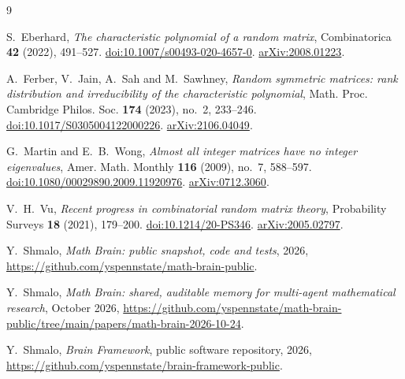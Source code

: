\documentclass[11pt]{amsart}
\theoremstyle{definition}
\theoremstyle{remark}
\numberwithin{equation}{section}
\begin{document}
\begin{thebibliography}{9}

S.~Eberhard,
\emph{The characteristic polynomial of a random matrix},
Combinatorica \textbf{42} (2022), 491--527.
\href{https://doi.org/10.1007/s00493-020-4657-0}{doi:10.1007/s00493-020-4657-0}.
\href{https://arxiv.org/abs/2008.01223}{arXiv:2008.01223}.

A.~Ferber, V.~Jain, A.~Sah and M.~Sawhney,
\emph{Random symmetric matrices: rank distribution and irreducibility of the characteristic polynomial},
Math. Proc. Cambridge Philos. Soc. \textbf{174} (2023), no.~2, 233--246.
\href{https://doi.org/10.1017/S0305004122000226}{doi:10.1017/S0305004122000226}.
\href{https://arxiv.org/abs/2106.04049}{arXiv:2106.04049}.

G.~Martin and E.~B.~Wong,
\emph{Almost all integer matrices have no integer eigenvalues},
Amer. Math. Monthly \textbf{116} (2009), no.~7, 588--597.
\href{https://doi.org/10.1080/00029890.2009.11920976}{doi:10.1080/00029890.2009.11920976}.
\href{https://arxiv.org/abs/0712.3060}{arXiv:0712.3060}.

V.~H.~Vu,
\emph{Recent progress in combinatorial random matrix theory},
Probability Surveys \textbf{18} (2021), 179--200.
\href{https://doi.org/10.1214/20-PS346}{doi:10.1214/20-PS346}.
\href{https://arxiv.org/abs/2005.02797}{arXiv:2005.02797}.

 Y.~Shmalo, \emph{Math Brain: public snapshot, code and tests}, 2026, \url{https://github.com/yspennstate/math-brain-public}.

 Y.~Shmalo, \emph{Math Brain: shared, auditable memory for multi-agent mathematical research}, October 2026, \url{https://github.com/yspennstate/math-brain-public/tree/main/papers/math-brain-2026-10-24}.

 Y.~Shmalo, \emph{Brain Framework}, public software repository, 2026, \url{https://github.com/yspennstate/brain-framework-public}.

\end{thebibliography}
\end{document}
